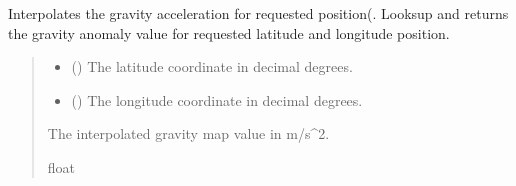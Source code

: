 \documentclass[letterpaper,10pt,english]{sphinxmanual}
\begin{document}
\begin{fulllineitems}
\begin{fulllineitems}
\end{fulllineitems}


\begin{fulllineitems}
\label{\detokenize{modules/gravity/ggm_plus:qnav.gravity.ggm_plus.GGMPlusAcc.get_map_value}}
\pysigstartsignatures
{}
\pysigstopsignatures
\sphinxAtStartPar
Interpolates the gravity acceleration for requested position(.
Looks\sphinxhyphen{}up and returns the gravity anomaly value for requested latitude
and longitude position.
\begin{quote}\begin{description}
\begin{itemize}
\item {} 
\sphinxAtStartPar
{} () \textendash{} The latitude coordinate in decimal degrees.

\item {} 
\sphinxAtStartPar
{} () \textendash{} The longitude coordinate in decimal degrees.

\end{itemize}

\sphinxAtStartPar
The interpolated gravity map value in m/s\textasciicircum{}2.

\sphinxAtStartPar
float

\end{description}\end{quote}

\end{fulllineitems}



\end{fulllineitems}
\end{document}
